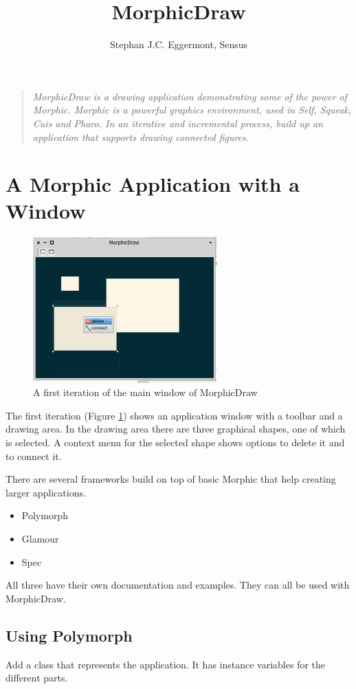 \documentclass[10pt, twoside]{article}   	%
\title{MorphicDraw}
\author{Stephan J.C. Eggermont, Sensus}
\begin{document}
\setlength{\parindent}{0pt}
\maketitle
\begin{quote}
\em
MorphicDraw is a drawing application demonstrating some of the power of Morphic.
Morphic is a powerful graphics environment, used in Self, Squeak, Cuis and Pharo.
In an iterative and incremental process, build up an application that supports
drawing connected figures.
\end{quote} 
\section{A Morphic Application with a Window}
\begin{figure}[htb]
\begin{center}
\includegraphics[width=200pt]{SimpleMorphicDrawWindow.png}
\caption{A first iteration of the main window of MorphicDraw}
\label{1stIteration}
\end{center}
\end{figure}
The first iteration (Figure \ref{1stIteration})  shows an application window 
with a toolbar and a drawing area. In the drawing area there are 
three graphical shapes, one of which is selected. A context menu
for the selected shape shows options to delete it and to connect it.

There are several frameworks build on top of basic Morphic that
help creating larger applications.
\begin{itemize}
\item Polymorph
\item Glamour
\item Spec
\end{itemize}
All three have their own documentation and examples. They can all 
be used with MorphicDraw.
\subsection{Using Polymorph}
Add a class that represents the application. It has instance variables for 
the different parts. 
\end{document}
